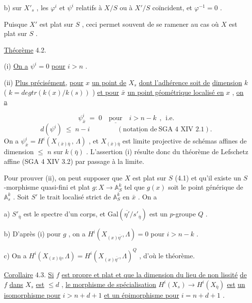 
b) sur  $X'_s$ , les  $\varphi^i$  et  $\psi^i$  relatifs à  $X/S$  ou à  $X'/S$  coïncident, et  $\varphi^{-1} = 0$ .

Puisque  $X'$  est plat sur  $S$ , ceci permet souvent de se ramener au cas où  $X$  est plat sur  $S$ .

\underline{Théorème} 4.2.

(i) \underline{On a}  $\psi^i = 0$  \underline{pour}  $i > n$ .

(ii) \underline{Plus précisément,} \underline{pour}  $x$  \underline{un point de}  $X_s$ \underline{dont l'adhérence soit de} \underline{dimension}  $k$  ( $k = deg tr(k(x)/k(s))$ ) \underline{et pour}  $\bar{x}$  \underline{un point géométrique localisé en} $x$ , \underline{on a}

\begin{equation*}
\psi^i_{\bar{x}} \;=\; 0 \quad \underline{\text{pour}} \quad i > n-k \;\, , \;\, \text{i.e.}
\end{equation*}
\begin{equation*}
d(\psi^i) \;\leqslant\; n-i \qquad\qquad (\underline{\text{notation de}}\ \text{SGA 4 XIV 2.1}).
\end{equation*}
On a  $\psi^i_{\bar{x}} = H^i(X_{(\bar{x})\bar\eta}\, ,\, \Lambda)$ , et  $X_{(\bar{x})\bar\eta}$  est limite projective de schémas affines de dimension  $\leqslant$  $n$ sur  $k(\bar\eta)$ . L'assertion (i) résulte donc du théorème de Lefschetz affine (SGA 4 XIV 3.2) par passage à la limite.

Pour prouver (ii), on peut supposer que  $X$  est plat sur  $S$  (4.1) et qu'il existe un  $S$-morphisme quasi-fini et plat  $g : X \longrightarrow \mathbb{A}^k_S$  tel que  $g(x)$  soit le point générique de  $\mathbb{A}^k_s$ . Soit  $S'$  le trait localisé strict de  $\mathbb{A}^k_S$  en  $\bar{x}$ . On a

a) $S'_{\bar\eta}$  est le spectre d'un corps, et  $\mathrm{Gal}(\overline{\eta'}/s'_{\bar\eta})$  est un $p$-groupe  $Q$ .

b) D'après (i) pour  $g$ , on a  $H^i(X_{(x)\overline{\eta'}},\Lambda) = 0$  pour  $i > n-k$ .

c) On a  $H^i(X_{(x)\bar\eta},\Lambda) = H^i(X_{(x)\overline{\eta'}},\Lambda)^Q$  , d'où le théorème.

\underline{Corollaire} 4.3.  \underline{Si}  $f$  \underline{est propre et plat et que la dimension du lieu de non lissité} \underline{de}  $f$  \underline{dans}  $X_s$  \underline{est}  $\leqslant d$ , \underline{le morphisme de spécialisation}  $H^i(X_s) \longrightarrow H^i(X_{\bar\eta})$  \underline{est} \underline{un isomorphisme pour}  $i > n+d+1$  \underline{et un épimorphisme pour}  $i = n+d+1$ .

